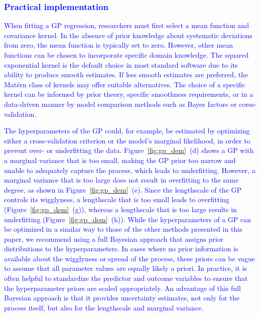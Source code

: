 \documentclass[man, floatsintext]{apa7}
\begin{document}
\subsubsection{\textcolor{blue}{Practical implementation}}

\textcolor{blue}{
  When fitting a GP regression, researchers must first select a mean function
  and covariance kernel. In the absence of prior knowledge about systematic
  deviations from zero, the mean function is typically set to zero. However,
  other mean functions can be chosen to incorporate specific domain knowledge.
  The squared exponential kernel is the default choice in most standard
  software due to its ability to produce smooth estimates. If less smooth
  estimates are preferred, the Matérn class of kernels may offer suitable
  alternatives. The choice of a specific kernel can be informed by prior
  theory, specific smoothness requirements, or in a data-driven manner by
  model comparison methods such as Bayes factors or corss-validation.
}

\textcolor{blue}{
  The hyperparameters of the GP could, for example, be estimated by optimizing
  either a cross-validation criterion or the model's marginal likelihood, in
  order to prevent over- or underfitting the data. Figure~\ref{fig:gp_dem}~(d)
  shows a GP with a marginal variance that is too small, making the GP prior
  too narrow and unable to adequately capture the process, which leads to
  underfitting. However, a marginal variance that is too large does not result
  in overfitting to the same degree, as shown in Figure~\ref{fig:gp_dem}~(e).
  Since the lengthscale of the GP controls its wigglyness, a lengthscale that
  is too small leads to overfitting (Figure~\ref{fig:gp_dem}~(g)), whereas a
  lengthscale that is too large results in underfitting
  (Figure~\ref{fig:gp_dem}~(h)). While the hyperparameters of a GP can be
  optimized in a similar way to those of the other methods presented in this
  paper, we recommend using a full Bayesian approach that assigns prior
  distributions to the hyperparameters. In cases where no prior information is
  available about the wigglyness or spread of the process, these priors can be
  vague to assume that all parameter values are equally likely a priori. In
  practice, it is often helpful to standardize the predictor and outcome
  variables to ensure that the hyperparameter priors are scaled appropriately.
  An advantage of this full Bayesian approach is that it provides uncertainty
  estimates, not only for the process itself, but also for the lengthscale and
  marginal variance.
}
\end{document}
